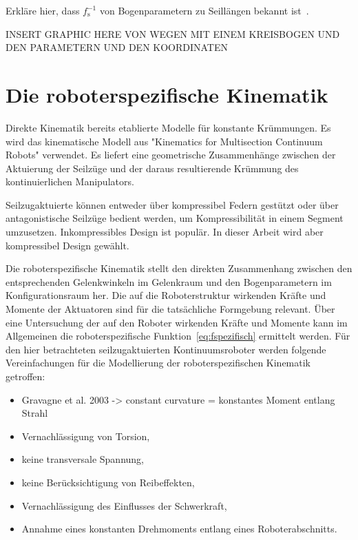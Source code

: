 Erkläre hier, dass $f^{-1}_\mathrm{s}$ von Bogenparametern zu Seillängen bekannt ist~\cite{JW06}.


INSERT GRAPHIC HERE VON WEGEN MIT EINEM KREISBOGEN UND DEN PARAMETERN UND DEN KOORDINATEN
\section{Die roboterspezifische Kinematik}
\label{sec:spezifischeKinematik}

Direkte Kinematik bereits etablierte Modelle für konstante Krümmungen. Es wird das kinematische Modell aus "Kinematics for Multisection Continuum Robots" \cite{JW06} verwendet. Es liefert eine geometrische Zusammenhänge zwischen der Aktuierung der Seilzüge und der daraus resultierende Krümmung des kontinuierlichen Manipulators.


Seilzugaktuierte können entweder über kompressibel Federn gestützt oder über antagonistische Seilzüge bedient werden, um Kompressibilität in einem Segment umzusetzen. Inkompressibles Design ist populär. In dieser Arbeit wird aber kompressibel Design gewählt.

Die roboterspezifische Kinematik stellt den direkten Zusammenhang zwischen den entsprechenden Gelenkwinkeln im Gelenkraum und den Bogenparametern im Konfigurationsraum her. Die auf die Roboterstruktur wirkenden Kräfte und Momente der Aktuatoren sind für die tatsächliche Formgebung relevant. Über eine Untersuchung der auf den Roboter wirkenden Kräfte und Momente kann im Allgemeinen die roboterspezifische Funktion~\eqref{eq:fspezifisch} ermittelt werden. Für den hier betrachteten seilzugaktuierten Kontinuumsroboter werden folgende Vereinfachungen für die Modellierung der roboterspezifischen Kinematik getroffen:

\begin{itemize}
\item Gravagne et al. 2003 -> constant curvature = konstantes Moment entlang Strahl
\end{itemize}

\begin{itemize}
\item Vernachlässigung von Torsion,
\item keine transversale Spannung,
\item keine Berücksichtigung von Reibeffekten,
\item Vernachlässigung des Einflusses der Schwerkraft,
\item Annahme eines konstanten Drehmoments entlang eines Roboterabschnitts.
\end{itemize}

